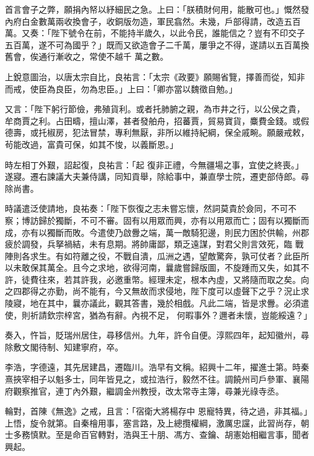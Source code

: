 \begin{pinyinscope}
 首言會子之弊，願捐內帑以紓細民之急。上曰：「朕積財何用，能散可也。」慨然發內府白金數萬兩收換會子，收銅版勿造，軍民翕然。未幾，戶部得請，改造五百萬。又奏：「陛下號令在前，不能持半歲久，以此令民，誰能信之？豈有不印交子五百萬，遂不可為國乎？」既而又欲造會子二千萬，屢爭之不得，遂請以五百萬換舊會，俟通行漸收之，常使不越千
 萬之數。



 上銳意圖治，以唐太宗自比，良祐言：「太宗《政要》願賜省覽，擇善而從，知非而戒，使臣為良臣，勿為忠臣。」上曰：「卿亦當以魏徵自勉。」



 又言：「陛下躬行節儉，弗殖貨利。或者托肺腑之親，為市井之行，以公侯之貴，牟商賈之利。占田疇，擅山澤，甚者發舶舟，招蕃賈，貿易寶貨，麋費金錢。或假德壽，或托椒房，犯法冒禁，專利無厭，非所以維持紀綱，保全戚畹。願嚴戒敕，茍能改過，富貴可保，如其不悛，以義斷恩。」



 時左相丁外艱，詔起復，良祐言：「起
 復非正禮，今無疆場之事，宜使之終喪。」遂寢。遷右諫議大夫兼侍講，同知貢舉，除給事中，兼直學士院，遷吏部侍郎。尋除尚書。



 時議遣泛使請地，良祐奏：「陛下恢復之志未嘗忘懷，然詞莫貴於僉同，不可不察；博訪歸於獨斷，不可不審。固有以用眾而興，亦有以用眾而亡；固有以獨斷而成，亦有以獨斷而敗。今遣使乃啟釁之端，萬一敵騎犯邊，則民力困於供輸，州郡疲於調發，兵拏禍結，未有息期。將帥庸鄙，類乏遠謀，對君父則言效死，臨
 戰陣則各求生。有如符離之役，不戰自潰，瓜洲之遇，望敵驚奔，孰可仗者？此臣所以未敢保其萬全。且今之求地，欲得河南，曩歲嘗歸版圖，不旋踵而又失，如其不許，徒費往來，若其許我，必邀重幣。經理未定，根本內虛，又將隨而取之矣。向之四郡得之亦勤，尚不能有，今又無故而求侵地，陛下度可以虛聲下之乎？況止求陵寢，地在其中，曩亦議此，觀其答書，幾於相戲。凡此二端，皆是求釁。必須遣使，則祈請欽宗梓宮，猶為有辭。內視不足，
 何暇事外？邇者未懷，豈能綏遠？」



 奏入，忤旨，貶瑞州居住，尋移信州。九年，許令自便。淳熙四年，起知徽州，尋除敷文閣待制、知建寧府，卒。



 李浩，字德遠，其先居建昌，遷臨川。浩早有文稱。紹興十二年，擢進士第。時秦熹挾宰相子以魁多士，同年皆見之，或拉浩行，毅然不往。調饒州司戶參軍、襄陽府觀察推官，連丁內外艱，繼調金州教授，改太常寺主簿，尋兼光祿寺丞。



 輪對，首陳《無逸》之戒，且言：「宿衛大將楊存中
 恩寵特異，待之過，非其福。」上悟，旋令就第。自秦檜用事，塞言路，及上總攬權綱，激厲忠讜，此習尚存，朝士多務慎默。至是命百官轉對，浩與王十朋、馮方、查鑰、胡憲始相繼言事，聞者興起。




\end{pinyinscope}
